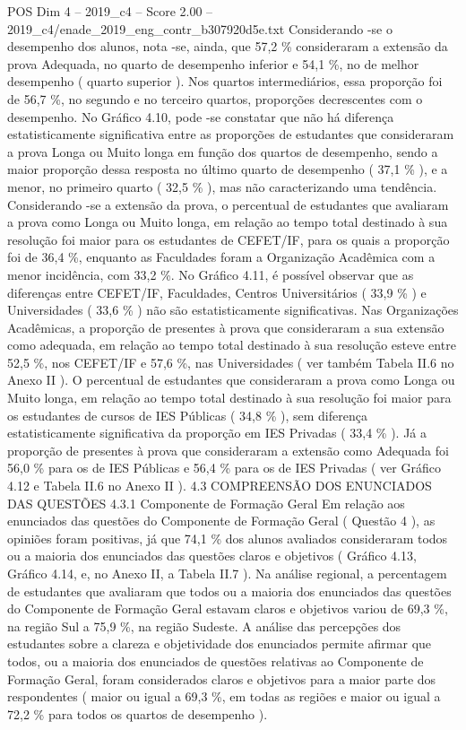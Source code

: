 \begin{textsample}{POS Dim 4 – 2019\_c4 – Score 2.00 – 2019\_c4/enade\_2019\_eng\_contr\_b307920d5e.txt}
Considerando -se o desempenho dos alunos, nota -se, ainda, que 57,2 \% consideraram a extensão da prova Adequada, no quarto de desempenho inferior e 54,1 \%, no de melhor desempenho ( quarto superior ).
Nos quartos intermediários, essa proporção foi de 56,7 \%, no segundo e no terceiro quartos, proporções decrescentes com o desempenho.
No Gráfico 4.10, pode -se constatar que não há diferença estatisticamente significativa entre as proporções de estudantes que consideraram a prova Longa ou Muito longa em função dos quartos de desempenho, sendo a maior proporção dessa resposta no último quarto de desempenho ( 37,1 \% ), e a menor, no primeiro quarto ( 32,5 \% ), mas não caracterizando uma tendência.
Considerando -se a extensão da prova, o percentual de estudantes que avaliaram a prova como Longa ou Muito longa, em relação ao tempo total destinado à sua resolução foi maior para os estudantes de CEFET/IF, para os quais a proporção foi de 36,4 \%, enquanto as Faculdades foram a Organização Acadêmica com a menor incidência, com 33,2 \%.
No Gráfico 4.11, é possível observar que as diferenças entre CEFET/IF, Faculdades, Centros Universitários ( 33,9 \% ) e Universidades ( 33,6 \% ) não são estatisticamente significativas.
Nas Organizações Acadêmicas, a proporção de presentes à prova que consideraram a sua extensão como adequada, em relação ao tempo total destinado à sua resolução esteve entre 52,5 \%, nos CEFET/IF e 57,6 \%, nas Universidades ( ver também Tabela II.6 no Anexo II ).
O percentual de estudantes que consideraram a prova como Longa ou Muito longa, em relação ao tempo total destinado à sua resolução foi maior para os estudantes de cursos de IES Públicas ( 34,8 \% ), sem diferença estatisticamente significativa da proporção em IES Privadas ( 33,4 \% ).
Já a proporção de presentes à prova que consideraram a extensão como Adequada foi 56,0 \% para os de IES Públicas e 56,4 \% para os de IES Privadas ( ver Gráfico 4.12 e Tabela II.6 no Anexo II ). 4.3 COMPREENSÃO DOS ENUNCIADOS DAS QUESTÕES 4.3.1 Componente de Formação Geral Em relação aos enunciados das questões do Componente de Formação Geral ( Questão 4 ), as opiniões foram positivas, já que 74,1 \% dos alunos avaliados consideraram todos ou a maioria dos enunciados das questões claros e objetivos ( Gráfico 4.13, Gráfico 4.14, e, no Anexo II, a Tabela II.7 ).
Na análise regional, a percentagem de estudantes que avaliaram que todos ou a maioria dos enunciados das questões do Componente de Formação Geral estavam claros e objetivos variou de 69,3 \%, na região Sul a 75,9 \%, na região Sudeste.
A análise das percepções dos estudantes sobre a clareza e objetividade dos enunciados permite afirmar que todos, ou a maioria dos enunciados de questões relativas ao Componente de Formação Geral, foram considerados claros e objetivos para a maior parte dos respondentes ( maior ou igual a 69,3 \%, em todas as regiões e maior ou igual a 72,2 \% para todos os quartos de desempenho ).

\end{textsample}
